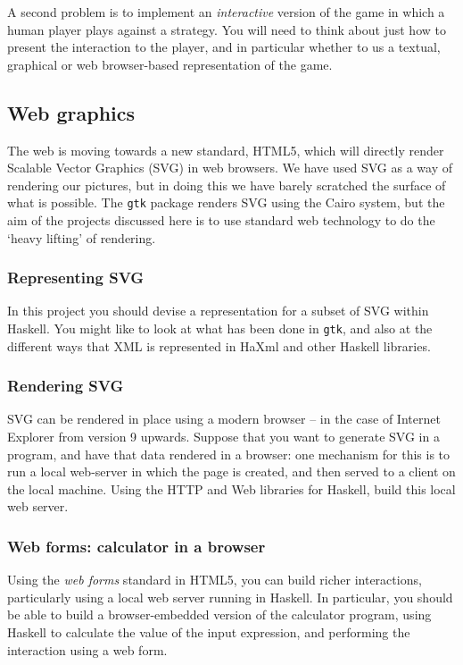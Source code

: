 A second problem is to implement an \emph{interactive} version of the game in which a human player plays against a strategy. You will need to think about just how to present the interaction to the player, and in particular whether to us a textual, graphical or web browser-based representation of the game.

\subsection*{Web graphics}

The web is moving towards a new standard, HTML5, which will directly render Scalable Vector Graphics (SVG) \cite{SVG} in web browsers. We have used SVG as a way of rendering our pictures, but in doing this we have barely scratched the surface of what is possible. The \texttt{gtk} package renders SVG using the Cairo system, but the aim of the projects discussed here is to use standard web technology to do the `heavy lifting' of rendering.

\subsubsection*{Representing SVG}

In this project you should devise a representation for a subset of SVG within Haskell. You might like to look at what has been done in \texttt{gtk}, and also at the different ways that XML is represented in HaXml and other Haskell libraries.

\subsubsection*{Rendering SVG}

SVG can be rendered in place using a modern browser -- in the case of Internet Explorer from version 9 upwards. Suppose that you want to generate SVG in a program, and have that data rendered in a browser: one mechanism for this is to run a local web-server in which the page is created, and then served to a client on the local machine. Using the HTTP and Web libraries for Haskell, build this local web server.

\subsubsection*{Web forms: calculator in a browser}

Using the \emph{web forms} standard in HTML5, you can build richer interactions, particularly using a local web server running in Haskell. In particular, you should be able to build a browser-embedded version of the calculator program, using Haskell to calculate the value of the input expression, and performing the interaction using a web form.

